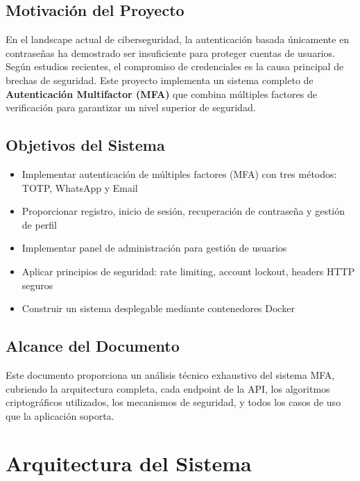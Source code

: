 \documentclass[12pt,a4paper,openany]{article}
\begin{document}
\subsection{Motivación del Proyecto}

En el landscape actual de ciberseguridad, la autenticación basada únicamente en contraseñas ha demostrado ser insuficiente para proteger cuentas de usuarios. Según estudios recientes, el compromiso de credenciales es la causa principal de brechas de seguridad. Este proyecto implementa un sistema completo de \textbf{Autenticación Multifactor (MFA)} que combina múltiples factores de verificación para garantizar un nivel superior de seguridad.

\subsection{Objetivos del Sistema}

\begin{itemize}[leftmargin=*, itemsep=3pt]
    \item Implementar autenticación de múltiples factores (MFA) con tres métodos: TOTP, WhatsApp y Email
    \item Proporcionar registro, inicio de sesión, recuperación de contraseña y gestión de perfil
    \item Implementar panel de administración para gestión de usuarios
    \item Aplicar principios de seguridad: rate limiting, account lockout, headers HTTP seguros
    \item Construir un sistema desplegable mediante contenedores Docker
\end{itemize}

\subsection{Alcance del Documento}

Este documento proporciona un análisis técnico exhaustivo del sistema MFA, cubriendo la arquitectura completa, cada endpoint de la API, los algoritmos criptográficos utilizados, los mecanismos de seguridad, y todos los casos de uso que la aplicación soporta.

\section{Arquitectura del Sistema}
\end{document}
